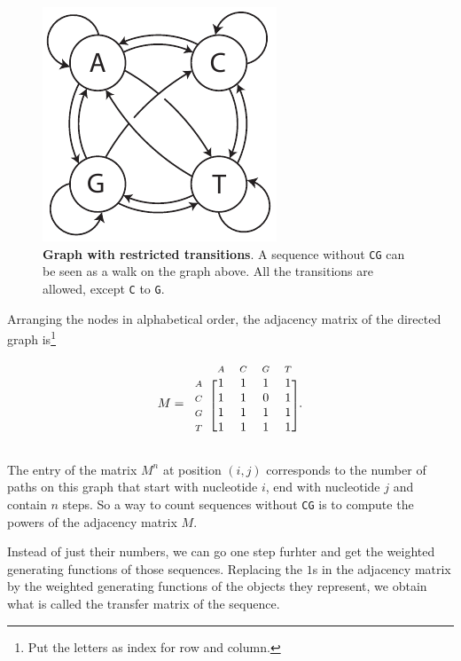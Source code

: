 \documentclass{article}
\newcommand{\smA}{\scriptstyle{A}}
\newcommand{\smC}{\scriptstyle{C}}
\newcommand{\smG}{\scriptstyle{G}}
\newcommand{\smT}{\scriptstyle{T}}
\begin{document}
\begin{figure}[h]
\centering
\includegraphics[scale=0.9]{CG_transitions.pdf}
\caption{\textbf{Graph with restricted transitions}.
A sequence without \texttt{CG} can be seen as a walk on the graph above.
All the transitions are allowed, except \texttt{C} to \texttt{G}.}
\label{fig:CG_transtions}
\end{figure}

Arranging the nodes in alphabetical order, the adjacency matrix of the
directed graph is\footnote{Put the letters as index for row and column.}

\begin{equation*}
M = 
\begin{blockarray}{ccccc}
     & \smA & \smC & \smG & \smT \\
\begin{block}{c[cccc]}
\smA & 1 & 1 & 1 & 1 \\
\smC & 1 & 1 & 0 & 1 \\
\smG & 1 & 1 & 1 & 1 \\
\smT & 1 & 1 & 1 & 1 \\
\end{block}
\end{blockarray}.
\end{equation*}

The entry of the matrix $M^n$ at position $(i,j)$ corresponds to the
number of paths on this graph that start with nucleotide $i$, end with
nucleotide $j$ and contain $n$ steps. So a way to count sequences without
\texttt{CG} is to compute the powers of the adjacency matrix $M$.

Instead of just their numbers, we can go one step furhter and get the
weighted generating functions of those sequences. Replacing the $1$s in the
adjacency matrix by the weighted generating functions of the objects they
represent, we obtain what is called the transfer matrix of the sequence.
\end{document}
